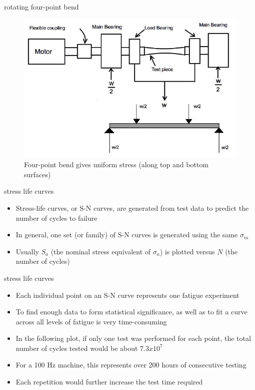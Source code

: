\documentclass[10pt]{beamer}
\begin{document}
\begin{frame}{rotating four-point bend}
	\begin{figure}
		\centering
		\includegraphics[width=0.7\linewidth]{../Figures/Rotating_Bending_Machine}
		\caption{Four-point bend gives uniform stress (along top and bottom surfaces)}
		\label{fig:Rotating_Bending_Machine}
	\end{figure}
\end{frame}

\begin{frame}{stress life curves}
	\begin{itemize}[<+->]
		\item Stress-life curves, or S-N curves, are generated from test data to predict the number of cycles to failure
		\item In general, one set (or family) of S-N curves is generated using the same $\sigma_m$
		\item Usually $S_a$ (the nominal stress equivalent of $\sigma_a$) is plotted versus $N$ (the number of cycles)
	\end{itemize}
\end{frame}

\begin{frame}{stress life curves}
	\begin{itemize}[<+->]
		\item Each individual point on an S-N curve represents one fatigue experiment
		\item To find enough data to form statistical significance, as well as to fit a curve across all levels of fatigue is very time-consuming
		\item In the following plot, if only one test was performed for each point, the total number of cycles tested would be about $7.3x10^7$
		\item For a 100 Hz machine, this represents over 200 hours of consecutive testing
		\item Each repetition would further increase the test time required
	\end{itemize}
\end{frame}
\end{document}
